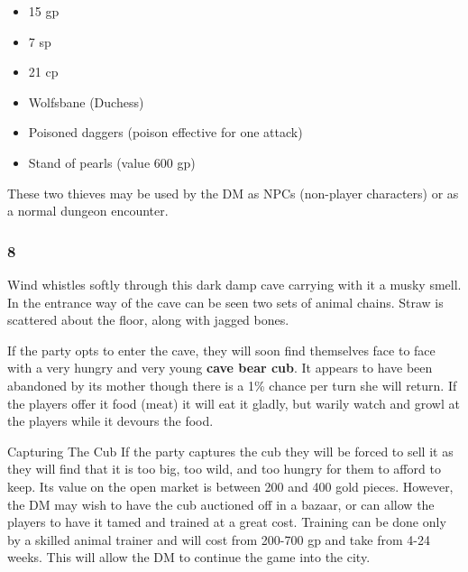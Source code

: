 \documentclass[palace_of_the_silver_princess]{subfiles}
\begin{document}
\begin{itemize}
    \item 15 gp
    \item 7 sp
    \item 21 cp
    \item Wolfsbane (Duchess)
    \item Poisoned daggers (poison effective for one attack)
    \item Stand of pearls (value 600 gp)
\end{itemize}

These two thieves may be used by the DM as NPCs (non-player characters)
or as a normal dungeon encounter.

\subsubsection{8}
\begin{quotebox}
    Wind whistles softly through this dark damp cave carrying with it a
    musky smell. In the entrance way of the cave can be seen two sets of
    animal chains. Straw is scattered about the floor, along with jagged
    bones.
\end{quotebox}

If the party opts to enter the cave, they will soon find themselves face
to face with a very hungry and very young \textbf{cave bear cub}.  It
appears to have been abandoned by its mother though there is a 1\%
chance per turn she will return. If the players offer it food (meat) it
will eat it gladly, but warily watch and growl at the players while it
devours the food.

\begin{paperbox}{Capturing The Cub}
If the party captures the cub they will be forced to sell it as they
will find that it is too big, too wild, and too hungry for them to
afford to keep. Its value on the open market is between 200 and 400 gold
pieces. However, the DM may wish to have the cub auctioned off in a
bazaar, or can allow the players to have it tamed and trained at a great
cost. Training can be done only by a skilled animal trainer and will
cost from 200-700 gp and take from 4-24 weeks. This will allow the DM to
continue the game into the city.
\end{paperbox}
\end{document}
